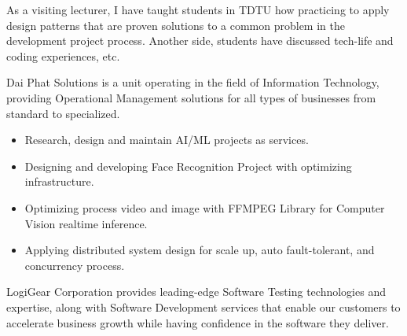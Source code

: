 \documentclass[10pt,a4paper,ragged2e,withhyper]{altacv}
\begin{document}
\begin{paracol}{2}
\divider


\begin{minipage}{\linewidth}
\justifying
As a visiting lecturer, I have taught students in TDTU how practicing to apply design patterns that are proven solutions to a common problem in the development project process. Another side, students have discussed tech-life and coding experiences, etc.
\end{minipage}

\bigskip

\divider

\medskip 


\begin{minipage}{\linewidth}
\justifying
    Dai Phat Solutions is a unit operating in the field of Information Technology, providing Operational Management solutions for all types of businesses from standard to specialized.
\end{minipage}
\medskip
\begin{itemize}
	\item Research, design and maintain AI/ML projects as services.
	\item Designing and developing Face Recognition Project with optimizing infrastructure.
	\item Optimizing process video and image with FFMPEG Library for Computer Vision realtime inference.
	\item Applying distributed system design for scale up, auto fault-tolerant, and concurrency process.
\end{itemize}

\smallskip

\divider

\medskip 


\begin{minipage}{\linewidth}
\justifying
    LogiGear Corporation provides leading-edge Software Testing technologies and expertise, along with Software Development services that enable our customers to accelerate business growth while having confidence in the software they deliver.
\end{minipage}


\end{paracol}
\end{document}
